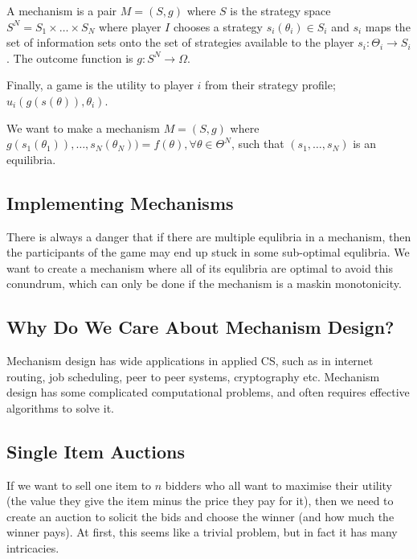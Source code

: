A mechanism is a pair $M = (S,g)$ where $S$ is the strategy space $S^N
= S_1 \times \dots \times S_N$ where player $I$ chooses a strategy
$s_i(\theta_i) \in S_i$ and $s_i$ maps the set of information sets
onto the set of strategies available to the player
$s_i: \Theta_i \rightarrow S_i$. The outcome function is $g:
S^N \rightarrow \Omega$.

Finally, a game is the utility to player $i$ from their strategy
profile; $u_i(g(s(\theta)), \theta_i)$.

We want to make a mechanism $M = (S,g)$ where
$g(s_1(\theta_1)), \dots, s_N(\theta_N)) =
f(\theta), \forall \theta \in \Theta^N$, such that $(s_1,\dots,s_N)$
is an equilibria.

\subsection{Implementing Mechanisms}

There is always a danger that if there are multiple equlibria in a
mechanism, then the participants of the game may end up stuck in some
sub-optimal equlibria. We want to create a mechanism where all of its
equlibria are optimal to avoid this conundrum, which can only be done
if the mechanism is a maskin monotonicity.


\subsection{Why Do We Care About Mechanism Design?}

Mechanism design has wide applications in applied CS, such as in
internet routing, job scheduling, peer to peer systems, cryptography
etc. Mechanism design has some complicated computational problems, and
often requires effective algorithms to solve it.

\subsection{Single Item Auctions}

If we want to sell one item to $n$ bidders who all want to maximise
their utility (the value they give the item minus the price they pay
for it), then we need to create an auction to solicit the bids and
choose the winner (and how much the winner pays). At first, this seems
like a trivial problem, but in fact it has many intricacies.


